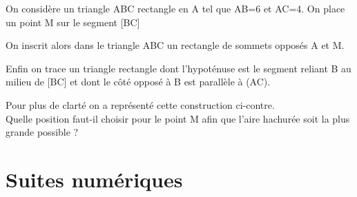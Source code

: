 \documentclass[oneside,12pt]{book}          %
\begin{document}
\begin{minipage}{0.55\linewidth}
On considère un triangle ABC rectangle en A tel que AB=6 et AC=4. On place un point M sur le segment [BC]
 
On inscrit alors dans le triangle ABC un rectangle de sommets opposés A et M.

Enfin on trace un triangle rectangle dont l'hypoténuse est le segment reliant B au milieu de [BC] et dont le côté opposé à B est parallèle à (AC).

Pour plus de clarté on a représenté cette construction ci-contre.\\

Quelle position faut-il choisir pour le point M afin que l'aire hachurée soit la plus grande possible ?
\end{minipage}\hfill
\begin{minipage}{0.4\linewidth}
\end{minipage}

\chapter{Suites numériques}
\newpage
\end{document}
